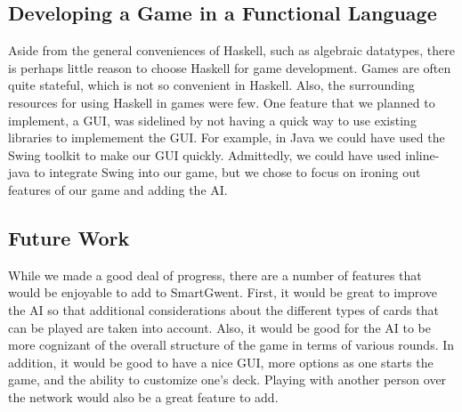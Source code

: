 \documentclass[numbers]{sigplanconf}
\begin{document}
\subsection{Developing a Game in a Functional Language}
Aside from the general conveniences of Haskell, such as algebraic datatypes, there is perhaps little reason to choose Haskell for game development. Games are often quite stateful, which is not so convenient in Haskell. Also, the surrounding resources for using Haskell in games were few. One feature that we planned to implement, a GUI, was sidelined by not having a quick way to use existing libraries to implemement the GUI. For example, in Java we could have used the Swing toolkit to make our GUI quickly. Admittedly, we could have used inline-java to integrate Swing into our game, but we chose to focus on ironing out features of our game and adding the AI.

\subsection{Future Work}
While we made a good deal of progress, there are a number of features that would be enjoyable to add to SmartGwent. First, it would be great to improve the AI so that additional considerations about the different types of cards that can be played are taken into account. Also, it would be good for the AI to be more cognizant of the overall structure of the game in terms of various rounds. In addition, it would be good to have a nice GUI, more options as one starts the game, and the ability to customize one's deck. Playing with another person over the network would also be a great feature to add.




\end{document}
